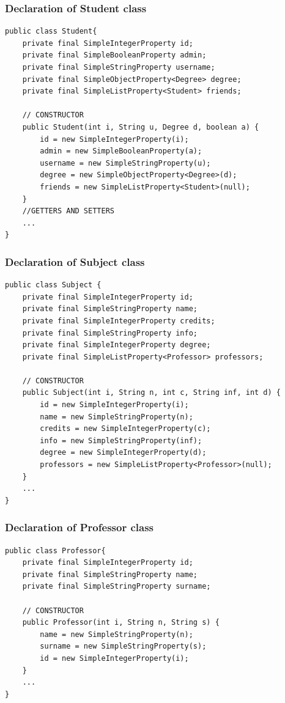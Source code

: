 \documentclass[a4paper]{article}
\begin{document}
\subsubsection{Declaration of Student class}
\begin{verbatim}
public class Student{
    private final SimpleIntegerProperty id;
    private final SimpleBooleanProperty admin;
    private final SimpleStringProperty username;
    private final SimpleObjectProperty<Degree> degree;
    private final SimpleListProperty<Student> friends;
    
    // CONSTRUCTOR
    public Student(int i, String u, Degree d, boolean a) {
        id = new SimpleIntegerProperty(i);
        admin = new SimpleBooleanProperty(a);
        username = new SimpleStringProperty(u);
        degree = new SimpleObjectProperty<Degree>(d);
        friends = new SimpleListProperty<Student>(null);
    }
    //GETTERS AND SETTERS
    ...
}
\end{verbatim}

\subsubsection{Declaration of Subject class}
\begin{verbatim}
public class Subject {
    private final SimpleIntegerProperty id;
    private final SimpleStringProperty name;
    private final SimpleIntegerProperty credits;
    private final SimpleStringProperty info;
    private final SimpleIntegerProperty degree;
    private final SimpleListProperty<Professor> professors;
	
    // CONSTRUCTOR
    public Subject(int i, String n, int c, String inf, int d) {
        id = new SimpleIntegerProperty(i);
        name = new SimpleStringProperty(n);
        credits = new SimpleIntegerProperty(c);
        info = new SimpleStringProperty(inf);
        degree = new SimpleIntegerProperty(d);
        professors = new SimpleListProperty<Professor>(null);
    }
    ...
}
\end{verbatim}

\subsubsection{Declaration of Professor class}
\begin{verbatim}
public class Professor{
    private final SimpleIntegerProperty id;
    private final SimpleStringProperty name;
    private final SimpleStringProperty surname;
	
    // CONSTRUCTOR
    public Professor(int i, String n, String s) {
        name = new SimpleStringProperty(n);
        surname = new SimpleStringProperty(s);
        id = new SimpleIntegerProperty(i);
    }
    ...
}
\end{verbatim}
\end{document}
